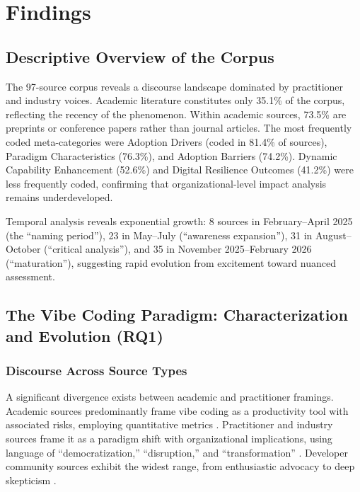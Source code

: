 \documentclass[preprint,12pt,authoryear]{elsarticle}
\begin{document}
\section{Findings}
\label{sec:findings}

\subsection{Descriptive Overview of the Corpus}

The 97-source corpus reveals a discourse landscape dominated by practitioner and industry voices. Academic literature constitutes only 35.1\% of the corpus, reflecting the recency of the phenomenon. Within academic sources, 73.5\% are preprints or conference papers rather than journal articles. The most frequently coded meta-categories were Adoption Drivers (coded in 81.4\% of sources), Paradigm Characteristics (76.3\%), and Adoption Barriers (74.2\%). Dynamic Capability Enhancement (52.6\%) and Digital Resilience Outcomes (41.2\%) were less frequently coded, confirming that organizational-level impact analysis remains underdeveloped.

Temporal analysis reveals exponential growth: 8 sources in February--April 2025 (the ``naming period''), 23 in May--July (``awareness expansion''), 31 in August--October (``critical analysis''), and 35 in November 2025--February 2026 (``maturation''), suggesting rapid evolution from excitement toward nuanced assessment.


\subsection{The Vibe Coding Paradigm: Characterization and Evolution (RQ1)}
\label{sec:RQ1}

\subsubsection{Discourse Across Source Types}

A significant divergence exists between academic and practitioner framings. Academic sources predominantly frame vibe coding as a productivity tool with associated risks, employing quantitative metrics \citep{Fawzy2025, SurveyVibeCoding2025, VibeCodingFlowDebt2025}. Practitioner and industry sources frame it as a paradigm shift with organizational implications, using language of ``democratization,'' ``disruption,'' and ``transformation'' \citep{Shmargad2025, McKinsey2025, Atos2025}. Developer community sources exhibit the widest range, from enthusiastic advocacy to deep skepticism \citep{Reddit2025, DEVCommunity2025}.
\end{document}

